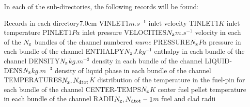 \noindent In each of the  sub-directories, the following records will be found:
\begin{DescriptionEnregistrement}{Records in each  directory}{7.0cm} \label{tabl:tabchanneldir}
 \RealEnr
 {VINLET}{$1$}{$m.s^{-1}$}
 {inlet velocity}
 \RealEnr
 {TINLET}{$1$}{$K$}
 {inlet temperature}
 \RealEnr
 {PINLET}{$1$}{$Pa$}
 {inlet pressure}
 \RealEnr
 {VELOCITIES}{$N_{\rm z}$}{$m.s^{-1}$}
 {velocity in each of the $N_{\rm z}$ bundles of the channel numbered {\sl numc}}
 \RealEnr
 {PRESSURE}{$N_{\rm z}$}{$Pa$}
 {pressure in each bundle of the channel}
 \RealEnr
 {ENTHALPY}{$N_{\rm z}$}{$J.kg^{-1}$}
 {enthalpy in each bundle of the channel}
 \RealEnr
 {DENSITY}{$N_{\rm z}$}{$kg.m^{-3}$}
 {density in each bundle of the channel}
 \RealEnr
 {LIQUID-DENS}{$N_{\rm z}$}{$kg.m^{-3}$}
 {density of liquid phase in each bundle of the channel}
 \RealEnr
 {TEMPERATURES}{$N_{\rm z}, N_{\rm dtot}$}{$K$}
 {distribution of the temperature in the fuel-pin for each bundle of the channel}
 \RealEnr
 {CENTER-TEMPS}{$N_{\rm z}$}{$K$}
 {center fuel pellet temperature in each bundle of the channel}
 \RealEnr
 {RADII}{$N_{\rm z}, N_{\rm dtot}-1$}{$m$}
 {fuel and clad radii}
\end{DescriptionEnregistrement}

\clearpage
